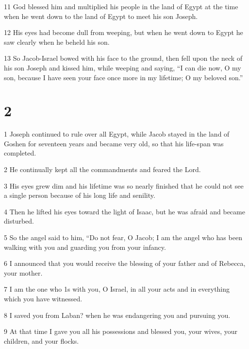 \par 11 God blessed him and multiplied his people in the land of Egypt at the time when he went down to the land of Egypt to meet his son Joseph. 

\par 12 His eyes had become dull from weeping, but when he went down to Egypt he saw clearly when he beheld his son. 

\par 13 So Jacob-Israel bowed with his face to the ground, then fell upon the neck of his son Joseph and kissed him, while weeping and saying, “I can die now, O my son, because I have seen your face once more in my lifetime; O my beloved son.”


\chapter{2}


\par 1 Joseph continued to rule over all Egypt, while Jacob stayed in the land of Goshen for seventeen years and became very old, so that his life-span was completed. 

\par 2 He continually kept all the commandments and feared the Lord. 

\par 3 His eyes grew dim and his lifetime was so nearly finished that he could not see a single person because of his long life and senility. 

\par 4 Then he lifted his eyes toward the light of Isaac, but he was afraid and became disturbed. 

\par 5 So the angel said to him, “Do not fear, O Jacob; I am the angel who has been walking with you and guarding you from your infancy. 

\par 6 I announced that you would receive the blessing of your father and of Rebecca, your mother. 

\par 7 I am the one who 1s with you, O Israel, in all your acts and in everything which you have witnessed. 

\par 8 I saved you from Laban? when he was endangering you and pursuing you. 

\par 9 At that time I gave you all his possessions and blessed you, your wives, your children, and your flocks. 

